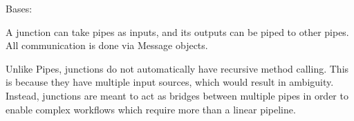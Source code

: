 \documentclass[letterpaper,10pt,english]{sphinxmanual}
\begin{document}
\label{\detokenize{Fireworks:module-Fireworks.core.junction}}

\begin{fulllineitems}
\label{\detokenize{Fireworks:Fireworks.core.junction.Junction}}
Bases: 

A junction can take pipes as inputs, and its outputs can be piped to other pipes.
All communication is done via Message objects.

Unlike Pipes, junctions do not automatically have recursive method calling. This is because they have multiple input sources,
which would result in ambiguity. Instead, junctions are meant to act as bridges between multiple pipes in order to enable
complex workflows which require more than a linear pipeline.

\end{fulllineitems}

\label{\detokenize{Fireworks:module-Fireworks.toolbox.junctions}}
\end{document}
